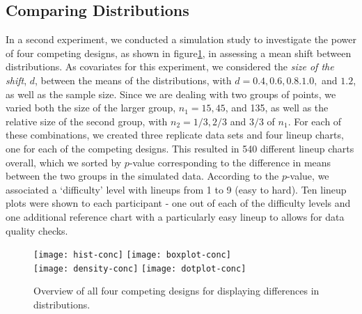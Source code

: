 
\subsection{Comparing Distributions}

In a second experiment, we conducted a simulation study to investigate the power of four competing designs, as shown in figure\ref{fig:expii}, in assessing a mean shift between distributions. As covariates for this experiment, we considered the {\it size of the shift}, $d$, between the means of the distributions, with $d=0.4, 0.6, 0.8. 1.0,$ and $1.2$, as well as the sample size.  Since we are dealing with two groups of points, we varied both the size of the larger group, $n_1 = 15, 45$, and 135, as well as the relative size of the second group, with $n_2 = 1/3, 2/3$ and $3/3$ of $n_1$. For each of these combinations, we created three replicate data sets and four lineup charts, one for each of the competing designs. This resulted in 540 different lineup charts overall, which we sorted by $p$-value corresponding to the difference in means between the two groups in the simulated data. According to the $p$-value, we associated a `difficulty' level with lineups from 1 to 9 (easy to hard). Ten lineup plots were shown to each participant - one out of each of the difficulty levels and one additional reference chart with a particularly easy lineup  to allows for data quality checks.
\begin{figure} [hbtp]
   \centering
   \texttt{[image: hist-conc]} 
   \texttt{[image: boxplot-conc]} \\
   \texttt{[image: density-conc]} 
   \texttt{[image: dotplot-conc]} 
   \caption{Overview of all four competing designs for displaying differences in distributions.}
   \label{fig:expii}
\end{figure}
